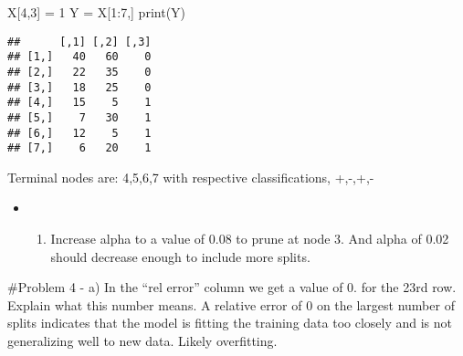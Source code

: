 \documentclass[
]{article}
\newenvironment{Shaded}{\begin{snugshade}}{\end{snugshade}}
\newcommand{\DecValTok}[1]{\textcolor[rgb]{0.00,0.00,0.81}{#1}}
\newcommand{\FunctionTok}[1]{\textcolor[rgb]{0.00,0.00,0.00}{#1}}
\newcommand{\NormalTok}[1]{#1}
\newcommand{\OtherTok}[1]{\textcolor[rgb]{0.56,0.35,0.01}{#1}}
\newcommand{\SpecialCharTok}[1]{\textcolor[rgb]{0.00,0.00,0.00}{#1}}
\providecommand{\tightlist}{%
  \setlength{\itemsep}{0pt}\setlength{\parskip}{0pt}}
\begin{document}
\begin{Shaded}
\begin{Highlighting}[]
\NormalTok{X[}\DecValTok{4}\NormalTok{,}\DecValTok{3}\NormalTok{] }\OtherTok{=} \DecValTok{1}
\NormalTok{Y }\OtherTok{=}\NormalTok{ X[}\DecValTok{1}\SpecialCharTok{:}\DecValTok{7}\NormalTok{,]}
\FunctionTok{print}\NormalTok{(Y)}
\end{Highlighting}
\end{Shaded}

\begin{verbatim}
##      [,1] [,2] [,3]
## [1,]   40   60    0
## [2,]   22   35    0
## [3,]   18   25    0
## [4,]   15    5    1
## [5,]    7   30    1
## [6,]   12    5    1
## [7,]    6   20    1
\end{verbatim}

Terminal nodes are: 4,5,6,7 with respective classifications, +,-,+,-

\begin{itemize}
\item
  \begin{enumerate}
  \def\labelenumi{\alph{enumi})}
  \setcounter{enumi}{2}
  \tightlist
  \item
    Increase alpha to a value of 0.08 to prune at node 3. And alpha of
    0.02 should decrease enough to include more splits.
  \end{enumerate}
\end{itemize}

\#Problem 4 - a) In the ``rel error'' column we get a value of 0. for
the 23rd row. Explain what this number means. A relative error of 0 on
the largest number of splits indicates that the model is fitting the
training data too closely and is not generalizing well to new data.
Likely overfitting.
\end{document}

